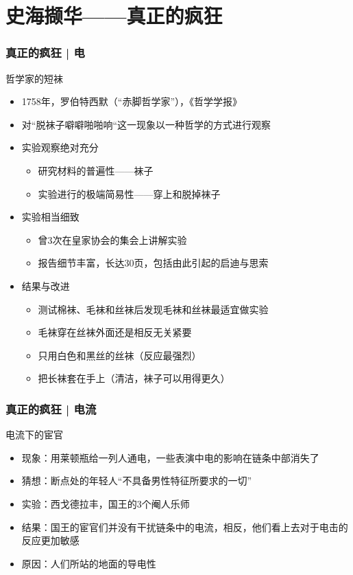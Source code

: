 \section{史海撷华——真正的疯狂}
\begin{frame}
  \frametitle{真正的疯狂 | 电}
  \begin{block}{哲学家的短袜}
    \begin{itemize}
      \item 1758年，罗伯特\textbullet 西默（“赤脚哲学家”），《哲学学报》
      \item 对“脱袜子噼噼啪啪响“这一现象以一种哲学的方式进行观察
      \pause
      \item 实验观察绝对充分
        \begin{itemize}
          \item 研究材料的普遍性——袜子
          \item 实验进行的极端简易性——穿上和脱掉袜子
        \end{itemize}
      \item 实验相当细致
        \begin{itemize}
          \item 曾3次在皇家协会的集会上讲解实验
          \item 报告细节丰富，长达30页，包括由此引起的启迪与思索
        \end{itemize}
      \item 结果与改进
        \begin{itemize}
          \item 测试棉袜、毛袜和丝袜后发现毛袜和丝袜最适宜做实验
          \item 毛袜穿在丝袜外面还是相反无关紧要
          \item 只用白色和黑丝的丝袜（反应最强烈）
          \item 把长袜套在手上（清洁，袜子可以用得更久）
        \end{itemize}
    \end{itemize}
  \end{block}
\end{frame}

\begin{frame}
  \frametitle{真正的疯狂 | 电流}
  \begin{block}{电流下的宦官}
    \begin{itemize}
      \item 现象：用莱顿瓶给一列人通电，一些表演中电的影响在链条中部消失了
      \pause
      \item 猜想：断点处的年轻人“不具备男性特征所要求的一切”
      \item 实验：西戈\textbullet 德拉丰，国王的3个阉人乐师
      \item 结果：国王的宦官们并没有干扰链条中的电流，相反，他们看上去对于电击的反应更加敏感
      \item 原因：人们所站的地面的导电性
    \end{itemize}
  \end{block}
\end{frame}

